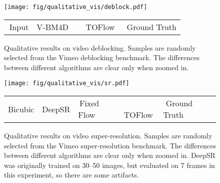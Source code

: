 \documentclass[twocolumn,natbib]{svjour3}          \smartqed  \usepackage{graphicx}
\begin{document}
\begin{figure*}[p]
    \centering
    \texttt{[image: fig/qualitative\_vis/deblock.pdf]}
    \begin{tabular}{C{4.2cm}C{3.2cm}C{3.2cm}C{4.2cm}}
         \,Input & \!V-BM4D & \,\,\,\,\,\,\,TOFlow & \,\,\,Ground Truth\\
    \end{tabular}
    \caption{Qualitative results on video deblocking. Samples are randomly selected from the Vimeo deblocking benchmark. The differences between different algorithms are clear only when zoomed in.}
    \label{fig:qualitativedeblock}
\end{figure*} \begin{figure*}[p]
    \centering
    \texttt{[image: fig/qualitative\_vis/sr.pdf]}
    \setlength{\tabcolsep}{0pt}
    \begin{tabular}{C{3.42cm}C{3.42cm}C{3.42cm}C{3.42cm}C{3.42cm}}
        Bicubic & DeepSR & \,Fixed Flow & \,\,TOFlow & \,\,Ground Truth \\
    \end{tabular}
    \caption{Qualitative results on video super-resolution. Samples are randomly selected from the Vimeo super-resolution benchmark. The differences between different algorithms are clear only when zoomed in. DeepSR was originally trained on 30--50 images, but evaluated on 7 frames in this experiment, so there are some artifacts.}
    \label{fig:qualitativesr}
\end{figure*}  
\end{document}
